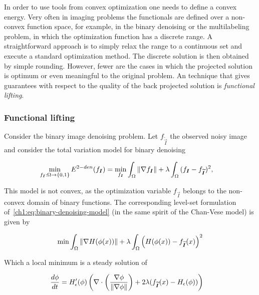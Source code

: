 In order to use tools from convex optimization one needs to define a convex energy. Very often in imaging problems the functionals are defined over a non-convex function space, for example, in the binary denoising or the multilabeling problem, in which the optimization function has a discrete range. A straightforward approach is to simply relax the range to a continuous set and execute a standard optimization method. The discrete solution is then obtained by simple rounding. However, fewer are the cases in which the projected solution is optimum or even meaningful to the original problem. An technique that gives guarantees with respect to the quality of the back projected solution is \emph{functional lifting}.

\subsubsection{Functional lifting}

Consider the binary image denoising problem. Let $f_{\widetilde{\vec{I}}}$ the observed noisy image and consider the total variation model for binary denoising

\begin{align}
	\min_{f_{\bm{I}}:\Omega \rightarrow \{0,1\} } E^{2-den}(f_{\bm{I}}) &= \min_{f_{\bm{I}}} \int_{\Omega}{\lVert\nabla f_{\bm{I}}\rVert} + \lambda \int_{\Omega}{ (f_{\bm{I}}-f_{\widetilde{\bm{I}}})^2}
	\label{ch1:eq:binary-denoising-model},
\end{align}

This model is not convex, as the optimization  variable $f_{\vec{I}}$ belongs to the non-convex domain of binary functions. The corresponding level-set formulation of~\cref{ch1:eq:binary-denoising-model} (in the same spirit of the Chan-Vese model) is given by

\begin{align}
	\min_{}{ \int_{\Omega}{ \lVert\nabla H(\phi(x))\rVert } + \lambda \int_{\Omega}{\left( H(\phi(x)) - f_{\widetilde{\bm{I}}}(x) \right)^2}}
	\label{ch1:eq:2-den-level-set-energy}
\end{align}

Which a local minimum is a steady solution of

\begin{align}
	\frac{d\phi}{dt} &= H_{\epsilon}^{\prime}(\phi)\left(  \nabla \cdot \left( \frac{ \nabla \phi}{\lVert\nabla \phi\rVert}\right) + 2\lambda(f_{\widetilde{\bm{I}}}(x) - H_{\epsilon}(\phi)) \right)
	\label{ch1:eq:level-set-ball-flow}
\end{align}

